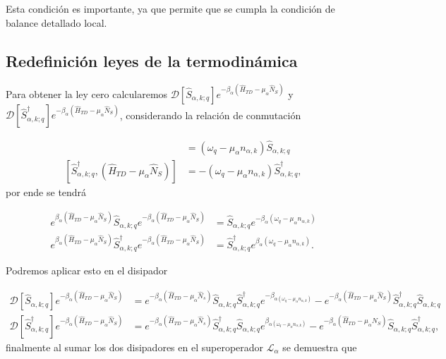 \begin{appendixs}
Esta condición es importante, ya que permite que se cumpla la condición de balance detallado local. 

\label{apendixKMS}


\newpage

\subsection{Redefinición leyes de la termodinámica}
Para obtener la ley cero calcularemos $\mathcal{D}[\hat{S}_{\alpha,k;q}]e^{-\beta_{\alpha}(\hat{H}_{TD} - \mu_{\alpha}\hat{N}_{S})}$ y $\mathcal{D}[\hat{S}^{\dagger}_{\alpha,k;q}]e^{-\beta_{\alpha}(\hat{H}_{TD} - \mu_{\alpha}\hat{N}_{S})}$, considerando la relación de conmutación

\begin{align*}
    [\hat{S}_{\alpha,k;q},(\hat{H}_{TD} - \mu_{\alpha}\hat{N}_{S})] & = (\omega_{q} - \mu_{\alpha}n_{\alpha,k})\hat{S}_{\alpha,k;q}  \\
    [\hat{S}^{\dagger}_{\alpha,k;q},(\hat{H}_{TD} - \mu_{\alpha}\hat{N}_{S})] & = -(\omega_{q} - \mu_{\alpha}n_{\alpha,k})\hat{S}^{\dagger}_{\alpha,k;q},
\end{align*}
por ende se tendrá

 \begin{align*}
    e^{\beta_{\alpha}(\hat{H}_{TD} - \mu_{\alpha}\hat{N}_{S})}\hat{S}_{\alpha,k;q} e^{-\beta_{\alpha}(\hat{H}_{TD} - \mu_{\alpha}\hat{N}_{S})} & = \hat{S}_{\alpha,k;q}e^{-\beta_{\alpha}(\omega_{q} - \mu_{\alpha}n_{\alpha,k})} \\
    e^{\beta_{\alpha}(\hat{H}_{TD} - \mu_{\alpha}\hat{N}_{S})}\hat{S}^{\dagger}_{\alpha,k;q} e^{-\beta_{\alpha}(\hat{H}_{TD} - \mu_{\alpha}\hat{N}_{S})} & = \hat{S}^{\dagger}_{\alpha,k;q}e^{\beta_{\alpha}(\omega_{q} - \mu_{\alpha}n_{\alpha,k})}.
 \end{align*}

Podremos aplicar esto en el disipador

\begin{align*}
    \mathcal{D}[\hat{S}_{\alpha,k;q}]e^{-\beta_{\alpha}(\hat{H}_{TD} - \mu_{\alpha}\hat{N}_{S})} & =  e^{-\beta_{\alpha}(\hat{H}_{TD} - \mu_{\alpha}\hat{N}_{s})} \hat{S}_{\alpha,k;q}\hat{S}^{\dagger}_{\alpha,k;q} e^{-\beta_{\alpha(\omega_{q} - \mu_{\alpha}n_{\alpha,k})}} - e^{-\beta_{\alpha}(\hat{H}_{TD} - \mu_{\alpha}\hat{N}_{S})} \hat{S}^{\dagger}_{\alpha,k;q}\hat{S}_{\alpha,k;q} \\
    \mathcal{D}[\hat{S}^{\dagger}_{\alpha,k;q}]e^{-\beta_{\alpha}(\hat{H}_{TD} - \mu_{\alpha}\hat{N}_{S})} & = e^{-\beta_{\alpha}(\hat{H}_{TD} - \mu_{\alpha}\hat{N}_{s})} \hat{S}^{\dagger}_{\alpha,k;q}\hat{S}_{\alpha,k;q} e^{\beta_{\alpha(\omega_{q} - \mu_{\alpha}n_{\alpha,k})}} - e^{-\beta_{\alpha}(\hat{H}_{TD} - \mu_{\alpha}\hat{N}_{S})} \hat{S}_{\alpha,k;q}\hat{S}^{\dagger}_{\alpha,k;q}, 
\end{align*}
finalmente al sumar los dos disipadores en el superoperador $\mathcal{L}_{\alpha}$ se demuestra que


\end{appendixs}
